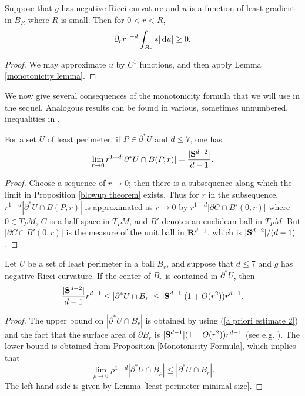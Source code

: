 \begin{proposition}\label{Monotonicity Formula}
Suppose that $g$ has negative Ricci curvature and $u$ is a function of least gradient in $B_R$ where $R$ is small. Then for $0 < r < R$,
$$\partial_r r^{1 - d} \int_{B_r} *|\mathop{}\!\mathrm{d} u| \geq 0.$$
\end{proposition}
\begin{proof}
We may approximate $u$ by $C^1$ functions, and then apply Lemma \ref{monotonicity lemma}.
\end{proof}

We now give several consequences of the monotonicity formula that we will use in the sequel.
Analogous results can be found in various, sometimes unnumbered, inequalities in \cite[Chapter 5]{Giusti77}.

\begin{lemma}\label{least perimeter minimal size}
For a set $U$ of least perimeter, if $P \in \partial^* U$ and $d \leq 7$, one has
$$\lim_{r \to 0} r^{1 - d} |\partial^* U \cap B(P, r)| = \frac{|\mathbf S^{d - 2}|}{d - 1}.$$
\end{lemma}
\begin{proof}
Choose a sequence of $r \to 0$; then there is a subsequence along which the limit in Proposition \ref{blowup theorem} exists.
Thus for $r$ in the subsequence, $r^{1 - d} |\partial^* U \cap B(P, r)|$ is approximated as $r \to 0$ by $r^{1 - d}|\partial C \cap B'(0, r)|$ where $0 \in T_PM$, $C$ is a half-space in $T_PM$, and $B'$ denotes an euclidean ball in $T_PM$.
But $|\partial C \cap B'(0, r)|$ is the measure of the unit ball in $\mathbf{R}^{d - 1}$, which is $|\mathbf S^{d - 2}|/(d - 1)$.
\end{proof}

\begin{proposition}\label{doubling dimension}
Let $U$ be a set of least perimeter in a ball $B_r$, and suppose that $d \leq 7$ and $g$ has negative Ricci curvature.
If the center of $B_r$ is contained in $\partial^* U$, then
$$\frac{|\mathbf S^{d - 2}|}{d - 1} r^{d - 1} \leq |\partial^*U \cap B_r| \leq |\mathbf S^{d - 1}|(1 + O(r^2))r^{d - 1}.$$
\end{proposition}
\begin{proof}
The upper bound on $|\partial^* U \cap B_r|$ is obtained by using (\ref{a priori estimate 2}) and the fact that the surface area of $\partial B_r$ is $|\mathbf S^{d - 1}|(1 + O(r^2))r^{d - 1}$ (see e.g. \cite{gray1974volume}).
The lower bound is obtained from Proposition \ref{Monotonicity Formula}, which implies that
$$\lim_{\rho \to 0} \rho^{1 - d} |\partial^* U \cap B_\rho| \leq |\partial^* U \cap B_r|.$$
The left-hand side is given by Lemma \ref{least perimeter minimal size}.
\end{proof}

